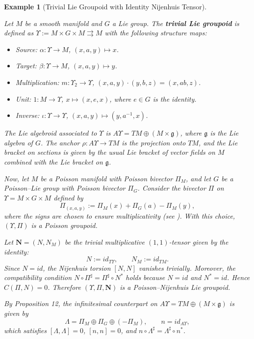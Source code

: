 \documentclass{article}
\newcommand{\II}{\Pi}
\newcommand{\NN}{\mathbf{N}}
\newcommand{\LL}{\Lambda}
\newtheorem{example}[theorem]{Example}
\begin{document}
\begin{example}[Trivial Lie Groupoid with Identity Nijenhuis Tensor]
\label{ex:trivial}

Let $M$ be a smooth manifold and $G$ a Lie group. The \textbf{trivial Lie groupoid} is defined as $\Upsilon := M \times G \times M \rightrightarrows M$ with the following structure maps:

\begin{itemize}
    \item Source: $\alpha: \Upsilon \to M$, $(x, a, y) \mapsto x$.
    \item Target: $\beta: \Upsilon \to M$, $(x, a, y) \mapsto y$.
    \item Multiplication: $m: \Upsilon_2 \to \Upsilon$, $(x, a, y) \cdot (y, b, z) = (x, ab, z)$.
    \item Unit: $1: M \to \Upsilon$, $x \mapsto (x, e, x)$, where $e \in G$ is the identity.
    \item Inverse: $\iota: \Upsilon \to \Upsilon$, $(x, a, y) \mapsto (y, a^{-1}, x)$.
\end{itemize}

The Lie algebroid associated to $\Upsilon$ is $A\Upsilon = TM \oplus (M \times \mathfrak{g})$, where $\mathfrak{g}$ is the Lie algebra of $G$. The anchor $\rho: A\Upsilon \to TM$ is the projection onto $TM$, and the Lie bracket on sections is given by the usual Lie bracket of vector fields on $M$ combined with the Lie bracket on $\mathfrak{g}$.

Now, let $M$ be a Poisson manifold with Poisson bivector $\Pi_M$, and let $G$ be a Poisson–Lie group with Poisson bivector $\Pi_G$. Consider the bivector $\II$ on $\Upsilon = M \times G \times M$ defined by
\[
\II_{(x,a,y)} := \Pi_M(x) + \Pi_G(a) - \Pi_M(y),
\]
where the signs are chosen to ensure multiplicativity (see \cite{A0Weinstein}). With this choice, $(\Upsilon, \II)$ is a Poisson groupoid.

Let $\NN = (N, N_M)$ be the trivial multiplicative $(1,1)$-tensor given by the identity:
\[
N := id_{T\Upsilon}, \qquad N_M := id_{TM}.
\]
Since $N = id$, the Nijenhuis torsion $[N, N]$ vanishes trivially. Moreover, the compatibility condition $N \circ \II^\sharp = \II^\sharp \circ N^*$ holds because $N = id$ and $N^* = id$. Hence $C(\II, N) = 0$. Therefore $(\Upsilon, \II, \NN)$ is a Poisson–Nijenhuis Lie groupoid.

By Proposition 12, the infinitesimal counterpart on $A\Upsilon = TM \oplus (M \times \mathfrak{g})$ is given by
\[
\LL = \Pi_M \oplus \Pi_G \oplus (-\Pi_M), \qquad n = id_{A\Upsilon},
\]
which satisfies $[\LL, \LL] = 0$, $[n, n] = 0$, and $n \circ \LL^\sharp = \LL^\sharp \circ n^*$.
\end{example}
\end{document}
